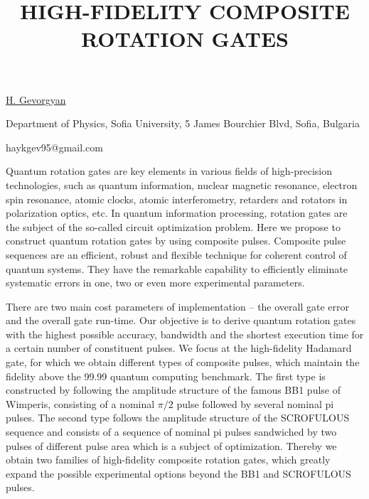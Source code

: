 \title{HIGH-FIDELITY COMPOSITE ROTATION GATES}

\underline{H. Gevorgyan}  

{\normalsize{\vspace{-4mm}
Department of Physics, Sofia University, 5 James Bourchier Blvd, Sofia, Bulgaria



\email haykgev95@gmail.com}}

Quantum rotation gates are key elements in various fields of 
high-precision technologies, such as quantum information, nuclear 
magnetic resonance, electron spin resonance, atomic clocks, atomic 
interferometry, retarders and rotators in polarization optics, etc. In 
quantum information processing, rotation gates are the subject of the 
so-called circuit optimization problem. Here we propose to construct 
quantum rotation gates by using composite pulses. Composite pulse 
sequences are an efficient, robust and flexible technique for coherent 
control of quantum systems. They have the remarkable capability to 
efficiently eliminate systematic errors in one, two or even more 
experimental parameters.

There are two main cost parameters of implementation – the overall gate 
error and the overall gate run-time. Our objective is to derive quantum 
rotation gates with the highest possible accuracy, bandwidth and the 
shortest execution time for a certain number of constituent pulses. We 
focus at the high-fidelity Hadamard gate, for which we obtain different 
types of composite pulses, which maintain the fidelity above the 99.99%
quantum computing benchmark. The first type is constructed by following 
the amplitude structure of the famous BB1 pulse of Wimperis, consisting 
of a nominal $\pi/2$ pulse followed by several nominal pi pulses. The 
second type follows the amplitude structure of the SCROFULOUS sequence 
and consists of a sequence of nominal pi pulses sandwiched by two pulses 
of different pulse area which is a subject of optimization. Thereby we 
obtain two families of high-fidelity composite rotation gates, which 
greatly expand the possible experimental options beyond the BB1 and 
SCROFULOUS pulses.


\vspace{\baselineskip}


